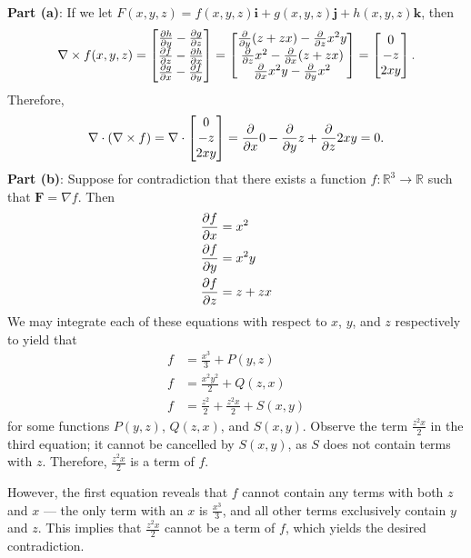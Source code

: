 \documentclass[11pt]{article}
\renewcommand{\vec}[1]{\mathbf{#1}}
\renewcommand{\grad}{\nabla}
\begin{document}
\textbf{Part (a)}: If we let $F(x, y, z) = f(x, y, z) \vec{i} + g(x, y, z) \vec{j} + h(x, y, z) \vec{k}$, then
\[
	\grad \times f(x, y, z) = \begin{bmatrix} \pdv{h}{y} - \pdv{g}{z} \\ \pdv{f}{z} - \pdv{h}{x} \\ \pdv{g}{x} - \pdv{f}{y} \end{bmatrix} = \begin{bmatrix} \pdv{y} (z + zx) - \pdv{z} x^{2} y \\ \pdv{z} x^{2} - \pdv{x} (z + zx) \\ \pdv{x} x^{2}y - \pdv{y} x^{2} \end{bmatrix} = \begin{bmatrix} 0 \\ -z \\ 2xy \end{bmatrix}.
\]
Therefore,
\[
	\grad \cdot (\grad \times f) = \grad \cdot \begin{bmatrix} 0 \\ -z \\ 2xy \end{bmatrix} = \pdv{x} 0 - \pdv{y} z + \pdv{z} 2xy = 0.
\]
\textbf{Part (b)}: Suppose for contradiction that there exists a function $f : \mathbb{R}^{3} \to \mathbb{R}$ such that $\vec{F} = \grad f$. Then 
\begin{align*}
	\pdv{f}{x} &= x^{2} \\
	\pdv{f}{y} &= x^{2} y \\
	\pdv{f}{z} &= z + zx
\end{align*}
We may integrate each of these equations with respect to $x$, $y$, and $z$ respectively to yield that
\begin{align*}
	f &= \frac{x^{3}}{3} + P(y, z) \\
	f &= \frac{x^{2}y^{2}}{2} + Q(z, x) \\
	f &= \frac{z^{2}}{2} + \frac{z^{2}x}{2} + S(x, y)
\end{align*}
for some functions $P(y, z)$, $Q(z, x)$, and $S(x, y)$. Observe the term $\tfrac{z^{2}x}{2}$ in the third equation; it cannot be cancelled by $S(x, y)$, as $S$ does not contain terms with $z$. Therefore, $\tfrac{z^{2}x}{2}$ is a term of $f$.

However, the first equation reveals that $f$ cannot contain any terms with both $z$ and $x$ --- the only term with an $x$ is $\tfrac{x^{3}}{3}$, and all other terms exclusively contain $y$ and $z$. This implies that $\tfrac{z^{2}x}{2}$ cannot be a term of $f$, which yields the desired contradiction.
\end{document}
